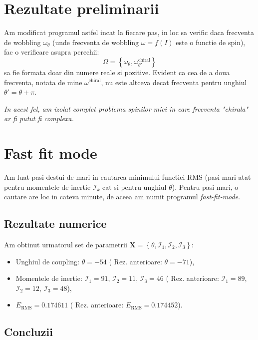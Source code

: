 \documentclass[11pt]{article}
\begin{document}
\maketitle
\section{Rezultate preliminarii}
Am modificat programul astfel incat la fiecare pas, in loc sa verific daca frecventa de wobbling $\omega_\theta$ (unde frecventa de wobbling $\omega=f(I)$ este o functie de spin), fac o verificare asupra perechii:$$\Omega=\left\{\omega_\theta,\omega^\text{chiral}_{\theta'}\right\}$$ sa fie formata doar din numere reale si pozitive.
Evident ca cea de a doua frecventa, notata de mine $\omega^\text{chiral}$, nu este altceva decat frecventa pentru unghiul $\theta'=\theta+\pi$.
\par \emph{In acest fel, am izolat complet problema spinilor mici in care frecventa "chirala" ar fi putut fi complexa.}
\section{Fast fit mode}
Am luat pasi destui de mari in cautarea minimului functiei RMS (pasi mari atat pentru momentele de inertie $\mathcal{I}_k$ cat si pentru unghiul $\theta$). Pentru pasi mari, o cautare are loc in cateva minute, de aceea am numit programul \emph{fast-fit-mode}.
\subsection{Rezultate numerice}
Am obtinut urmatorul set de parametrii $\mathbf{X}=\left\{\theta,\mathcal{I}_1,\mathcal{I}_2,\mathcal{I}_3\right\}$:

\begin{itemize}
    \item Unghiul de coupling: $\theta=-54$\hspace{1cm} ({\color{red} Rez. anterioare: $\theta=-71$}),
    \item Momentele de inertie: $\mathcal{I}_1=91$, $\mathcal{I}_2=11$, $\mathcal{I}_3=46$\hspace{1cm} ({\color{red} Rez. anterioare: $\mathcal{I}_1=89$, $\mathcal{I}_2=12$, $\mathcal{I}_3=48$}),
    \item $E_\text{RMS}=0.174611$\hspace{1cm} ({\color{red} Rez. anterioare: $E_\text{RMS}=0.174452$}).
\end{itemize}

\subsection{Concluzii}
\end{document}
